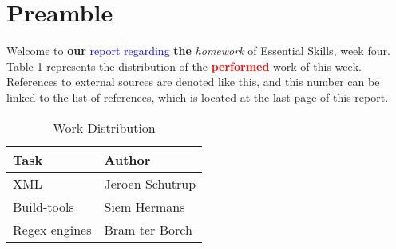 \section{Preamble}
Welcome to \textbf{our} \textcolor{blue}{report regarding} \textbf{the} \textit{homework} of Essential Skills, week four. Table \ref{table:distribution} represents the distribution of the \textbf{\textcolor{red}{performed}} work of \underline{this week}. References to external sources are denoted like this\cite[99]{Silberschatz:Galvin:2009}, and this number can be linked to the list of references, which is located at the last page of this report.

\begin{table}[h]
\begin{center}
\begin{tabular}{ | l | l | }
	\hline
	\textbf{Task}	&	\textbf{Author}	\\
	\hline
	XML		&	Jeroen Schutrup		\\
	\hline
	Build-tools	&	Siem Hermans		\\
	\hline
	Regex engines	&	Bram ter Borch		\\
	\hline
\end{tabular}
\caption{Work Distribution}
\label{table:distribution}
\end{center}
\end{table}
